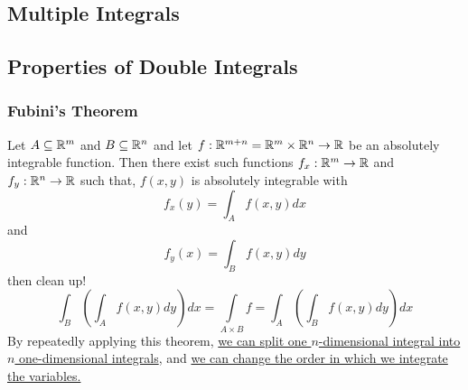 \subsection{Multiple Integrals}

\begin{comment}
Recall that $$\int_{a}^{b} f(x) dx = \lim_{n \to \infty} \sum_{i=1}^{n} f(x_{i}^{*})\Delta x $$

We can similarly define an integral of a function $f(x,y)$ defined on a closed rectangle $R = [a,b] \times [c,d] = \big\{ (x,y) \in \mathbb{R}^{2} \, | \, a \leq x \leq b, \, c \leq y \leq d \big\} $

The graph of $f$ is a surface with equation $f(x,y) = z$. Let $S$ be the solid that lies above $R$ and under the graph of $f$ such that $$S = \{(x,y,z) \in \mathbb{R}^{3} \, | \, 0 \leq z \leq f(x,y), \, f(x,y) \in \mathbb{R}^{2}\}$$

Likewise, the double integral over the rectangle $R$ is defined $$\iint\limits_{R} f(x,y) dA = \lim_{n,m \to \infty} \sum_{i=1}^{m} \sum_{j=1}^{n} f(x_{ij}^{*}, y_{ij}^{*})\Delta A$$

More precisely, for every number $\epsilon > 0$ there is an integer $N$ such that

$$\Big| \iint\limits_{R} f(x,y) dA - \lim_{n,m \to \infty} \sum_{i=1}^{m} \sum_{j=1}^{n} f(x_{ij}^{*}, y_{ij}^{*})\Delta A \Big| < \epsilon$$

for all integers $n$ and $m$ greater than $N$ and for any choice of sample points $(x_{ij}^{*}, y_{ij}^{*}) \in R_{ij}$. A function $f$ is called integrable if such a limit exists; all continuous functions are integrable.
\end{comment}

\subsection{Properties of Double Integrals}

\subsubsection{Fubini's Theorem}



 Let $A \subseteq \mathbb{R}^m$ and $B \subseteq \mathbb{R}^n$ and let $f : \mathbb{R}^{m + n} = \mathbb{R}^m \times \mathbb{R}^n \to \mathbb{R}$ be an absolutely integrable function. Then there exist such functions $f_x : \mathbb{R}^m\to \mathbb{R}$ and $f_y : \mathbb{R}^n \to \mathbb{R}$ such that, $f(x,y)$ is absolutely integrable with $$f_x(y) = \int_A f(x,y) dx$$ and $$f_y(x) = \int_B f(x,y) dy$$ then \todo clean up! $$ \int_B \left( \int_A f(x,y) dy \right) dx = \int\limits_{A \times B} f = \int_A \left( \int_B f(x,y) dy \right) dx$$ By repeatedly applying this theorem, \uline{we can split one $n$-dimensional integral into $n$ one-dimensional integrals}, and \uline{we can change the order in which we integrate the variables.}

